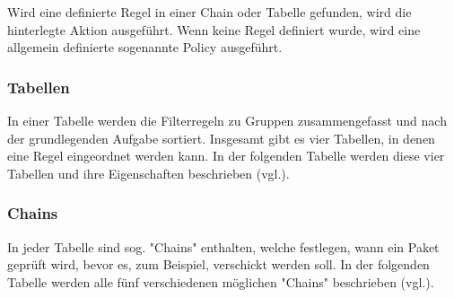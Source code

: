 \documentclass[
a4paper,     %
 headsepline, %
footsepline, %
titlepage,   %
 halfparskip,     %
 fleqn,       %
12pt         %
]{scrartcl}  %
\begin{document}
Wird eine definierte Regel in einer Chain oder Tabelle gefunden, wird die hinterlegte Aktion ausgeführt. Wenn keine Regel definiert wurde, wird eine allgemein definierte sogenannte Policy ausgeführt.

\subsubsection{Tabellen}
In einer Tabelle werden die Filterregeln zu Gruppen zusammengefasst und nach der grundlegenden Aufgabe sortiert. Insgesamt gibt es vier Tabellen, in denen eine Regel eingeordnet werden kann. In der folgenden Tabelle werden diese vier Tabellen und ihre Eigenschaften beschrieben (vgl.\cite{iptables-1}). 

\begin{table}[!h]
\centering
{}
\caption{IP-Tables: Tabellen}
\label{Tables: Tabellen}
\end{table}
 
\subsubsection{Chains}
In jeder Tabelle sind sog. "Chains" enthalten, welche festlegen, wann ein Paket geprüft wird, bevor es, zum Beispiel, verschickt werden soll. In der folgenden Tabelle werden alle fünf verschiedenen möglichen "Chains" beschrieben (vgl.\cite{iptables-1}). 
\end{document}
